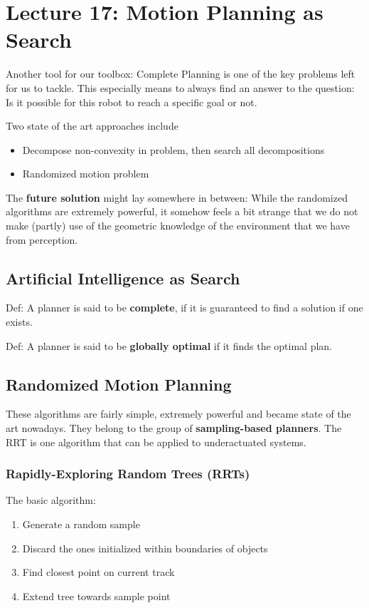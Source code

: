 \chapter{Lecture 17: Motion Planning as Search}
Another tool for our toolbox: Complete Planning is one of the key problems left for us to tackle. This especially means to always find an answer to the question: Is it possible for this robot to reach a specific goal or not.

Two state of the art approaches include
\begin{itemize}
\item Decompose non-convexity in problem, then search all decompositions
\item Randomized motion problem
\end{itemize}  

The \textbf{future solution} might lay somewhere in between: While the randomized algorithms are extremely powerful, it somehow feels a bit strange that we do not make (partly) use of the geometric knowledge of the environment that we have from perception.


\section{Artificial Intelligence as Search}
Def: A planner is said to be \textbf{complete}, if it is guaranteed to find a solution if one exists.

Def: A planner is said to be \textbf{globally optimal} if it finds the optimal plan.

\section{Randomized Motion Planning}
These algorithms are fairly simple, extremely powerful and became state of the art nowadays. They belong to the group of \textbf{sampling-based planners}. The RRT is one algorithm that can be applied to underactuated systems. 
\subsection{Rapidly-Exploring Random Trees (RRTs)}
The basic algorithm: 
\begin{enumerate}
\item Generate a random sample
\item Discard the ones initialized within boundaries of objects
\item Find closest point on current track
\item Extend tree towards sample point
\end{enumerate}

